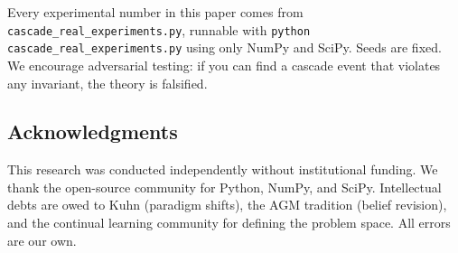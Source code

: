 \documentclass[11pt,a4paper]{article}
\theoremstyle{definition}
\begin{document}
Every experimental number in this paper comes from \texttt{cascade\_real\_experiments.py}, runnable with \texttt{python cascade\_real\_experiments.py} using only NumPy and SciPy. Seeds are fixed. We encourage adversarial testing: if you can find a cascade event that violates any invariant, the theory is falsified.

\subsection*{Acknowledgments}

This research was conducted independently without institutional funding. We thank the open-source community for Python, NumPy, and SciPy. Intellectual debts are owed to Kuhn (paradigm shifts), the AGM tradition (belief revision), and the continual learning community for defining the problem space. All errors are our own.
\end{document}
